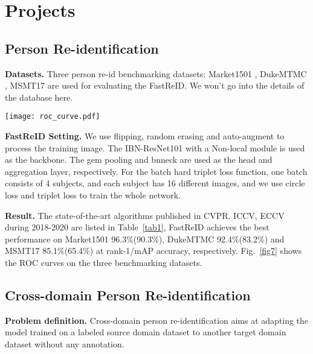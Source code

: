 \documentclass[10pt,twocolumn,letterpaper]{article}
\begin{document}
\section{Projects}
\subsection{Person Re-identification}
\noindent\textbf{Datasets.} Three person re-id benchmarking datasets: Market1501 \cite{bai2017scalable}, DukeMTMC \cite{zheng2017unlabeled}, MSMT17 \cite{qian2019leader} are used for evaluating the FastReID. We won't go into the details of the database here.



\begin{figure*}[t]
    \texttt{[image: roc\_curve.pdf]}
     \caption{ROC curves and distribution curves between intra-class and inter-class samples on three benchmarking datasets for FastReID (ResNet101-ibn)}
    \label{fig7}
    \vspace{-1em}
\end{figure*}

\noindent\textbf{FastReID Setting.} We use flipping, random erasing and auto-augment to process the training image. The IBN-ResNet101 with a Non-local module is used as the backbone. The gem pooling and bnneck are used as the head and aggregation layer, respectively. For the batch hard triplet loss
function, one batch consists of 4 subjects, and each subject has 16 different images, and we use circle loss and triplet loss to train the whole network. 

\noindent\textbf{Result.} The state-of-the-art algorithms published in CVPR, ICCV, ECCV during 2018-2020 are listed in Table~\ref{tab1}, FastReID achieves the best performance on Market1501  96.3\%(90.3\%), DukeMTMC 92.4\%(83.2\%) and MSMT17 85.1\%(65.4\%) at rank-1/mAP accuracy, respectively. Fig.~\ref{fig7} shows the ROC curves on the three benchmarking datasets.


\subsection{Cross-domain Person Re-identification}
\noindent\textbf{Problem definition.} Cross-domain person re-identification aims at adapting the model trained on a labeled source domain dataset to another target domain dataset without any annotation. 
\end{document}
